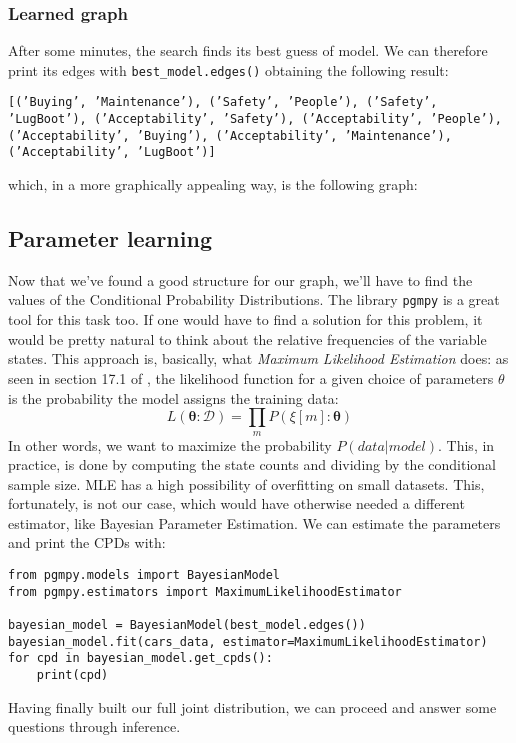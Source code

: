 \subsubsection{Learned graph}
After some minutes, the search finds its best guess of model. We can therefore print its edges with \texttt{best\_model.edges()} obtaining the following result:
\begin{center}
\texttt{[('Buying', 'Maintenance'), ('Safety', 'People'), ('Safety', 'LugBoot'), ('Acceptability', 'Safety'), ('Acceptability', 'People'), ('Acceptability', 'Buying'), ('Acceptability', 'Maintenance'), ('Acceptability', 'LugBoot')]}
\end{center}
which, in a more graphically appealing way, is the following graph:
\subsection{Parameter learning}
Now that we've found a good structure for our graph, we'll have to find the values of the Conditional Probability Distributions. The library \texttt{pgmpy} is a great tool for this task too. If one would have to find a solution for this problem, it would be pretty natural to think about the relative frequencies of the variable states. This approach is, basically, what \textit{Maximum Likelihood Estimation} does: as seen in section 17.1 of \cite{book:probgraphmod}, the likelihood function for a given choice of parameters $\theta$ is the probability the model assigns the training data:
\begin{equation}
L(\boldsymbol{\theta}: \mathcal{D})=\prod_{m} P(\xi[m]: \boldsymbol{\theta})
\end{equation}
In other words, we want to maximize the probability $P(data|model)$. This, in practice, is done by computing the state counts and dividing by the conditional sample size.
MLE has a high possibility of overfitting on small datasets. This, fortunately, is not our case, which would have otherwise needed a different estimator, like Bayesian Parameter Estimation. We can estimate the parameters and print the CPDs with:
\begin{verbatim}
from pgmpy.models import BayesianModel
from pgmpy.estimators import MaximumLikelihoodEstimator

bayesian_model = BayesianModel(best_model.edges())
bayesian_model.fit(cars_data, estimator=MaximumLikelihoodEstimator)
for cpd in bayesian_model.get_cpds():
    print(cpd)
\end{verbatim}
Having finally built our full joint distribution, we can proceed and answer some questions through inference.